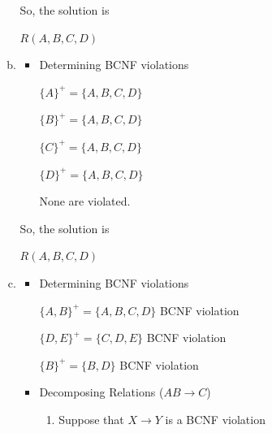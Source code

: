\documentclass[12pt]{article}
\begin{document}
\begin{enumerate}[1.]
\begin{enumerate}[a)]
        \bigskip

        So, the solution is

        \bigskip

        $R(A,B,C,D)$

        \item


        \begin{itemize}
            \item Determining BCNF violations

            \bigskip

            $\{A\}^+ = \{A,B,C,D\}$

            \bigskip

            $\{B\}^+ = \{A,B,C,D\}$

            \bigskip

            $\{C\}^+ = \{A,B,C,D\}$

            \bigskip

            $\{D\}^+ = \{A,B,C,D\}$

            \bigskip

            None are violated.
        \end{itemize}

        \bigskip

        So, the solution is

        \bigskip

        $R(A,B,C,D)$

        \item


        \begin{itemize}
            \item Determining BCNF violations

            \bigskip

            $\{A,B\}^+ = \{A,B,C,D\}$ \color{red}BCNF violation\color{black}

            \bigskip

            $\{D,E\}^+ = \{C,D,E\}$ \color{red}BCNF violation\color{black}

            \bigskip

            $\{B\}^+ = \{B,D\}$ \color{red}BCNF violation\color{black}

            \item Decomposing Relations ($AB \to C$)

            \begin{enumerate}[1.]
                \item Suppose that $X \to Y$ is a BCNF violation


\end{enumerate}
\end{itemize}
\end{enumerate}
\end{enumerate}
\end{document}
